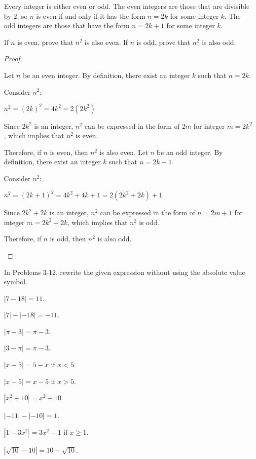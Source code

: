 \begin{questions}
  \item Every integer is either even or odd. The even integers are those that are divisible by $2$, so $n$ is even if and only if it has the form $n=2k$ for some integer $k$. The odd integers are those that have the form $n=2k + 1$ for some integer $k$.
  \begin{tasks}
    \task If $n$ is even, prove that $n^2$ is also even.
    \task If $n$ is odd, prove that $n^2$ is also odd.
  \end{tasks}

  \begin{proof}
    \begin{tasks}
      \task Let $n$ be an even integer. By definition, there exist an integer $k$ such that $n=2k$.

      Consider $n^2$:

      $n^2=(2k)^2=4k^2=2(2k^2)$

      Since $2k^2$ is an integer, $n^2$ can be expressed in the form of $2m$ for integer $m=2k^2$, which implies that $n^2$ is even.

      Therefore, if $n$ is even, then $n^2$ is also even.
      \task Let $n$ be an odd integer. By definition, there exist an integer $k$ such that $n=2k+1$.

      Consider $n^2$:

      $n^2=(2k+1)^2 = 4k^2+4k+1=2(2k^2+2k) + 1$

      Since $2k^2+2k$ is an integer, $n^2$ can be expressed in the form of $n = 2m+1$ for integer $m=2k^2+2k$, which implies that $n^2$ is odd.

      Therefore, if $n$ is odd, then $n^2$ is also odd.
    \end{tasks}
  \end{proof}

  In Problems 3-12, rewrite the given expression without using the absolute value symbol.
  \begin{solution}
    \item $ \left| 7 - 18 \right| = 11 $.
    \item $ \left| 7 \right| - \left| - 18 \right| = -11 $.
    \item $ \left| \pi - 3\right| = \pi - 3 $.
    \item $ \left| 3 - \pi \right| = \pi - 3 $.
    \item $ \left| x - 5 \right| = 5 - x $ if $ x < 5 $.
    \item $ \left| x - 5 \right| = x - 5 $ if $ x > 5 $.
    \item $ \left| x^2 + 10 \right| = x^2 + 10$.
    \item $ \left| -11 \right| - \left| -10 \right| = 1 $.
    \item $ \left| 1 - 3x^2 \right| = 3x^2 - 1 $ if $ x \geq 1 $.
    \item $ \left| \sqrt{10} - 10 \right| = 10 - \sqrt{10} $.
  \end{solution}


\end{questions}
